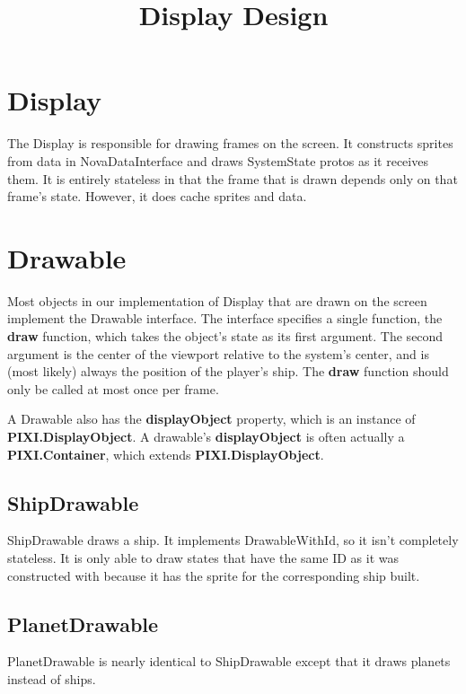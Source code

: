 \documentclass{article}
\title{Display Design}
\begin{document}
\maketitle
\section{Display}
The Display is responsible for drawing frames on the screen. It constructs sprites from data in NovaDataInterface and draws SystemState protos as it receives them. It is entirely stateless in that the frame that is drawn depends only on that frame's state. However, it does cache sprites and data.

\section{Drawable}
Most objects in our implementation of Display that are drawn on the screen implement the Drawable interface. The interface specifies a single function, the \textbf{draw} function, which takes the object's state as its first argument. The second argument is the center of the viewport relative to the system's center, and is (most likely) always the position of the player's ship. The \textbf{draw} function should only be called at most once per frame.

A Drawable also has the \textbf{displayObject} property, which is an instance of \textbf{PIXI.DisplayObject}. A drawable's \textbf{displayObject} is often actually a \textbf{PIXI.Container}, which extends \textbf{PIXI.DisplayObject}.



\subsection{ShipDrawable}
ShipDrawable draws a ship. It implements DrawableWithId, so it isn't completely stateless. It is only able to draw states that have the same ID as it was constructed with because it has the sprite for the corresponding ship built. 
\subsection{PlanetDrawable}
PlanetDrawable is nearly identical to ShipDrawable except that it draws planets instead of ships.
\end{document}
